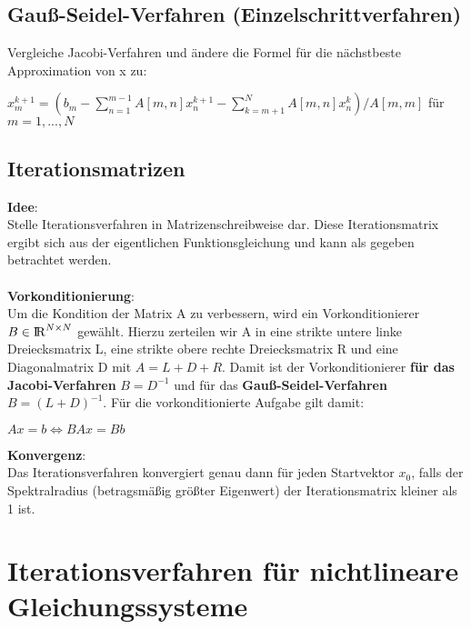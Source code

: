 \documentclass[10pt,a4paper]{article}
\def\realnumbers{{\rm I\!R}}
\begin{document}
	\subsection{Gauß-Seidel-Verfahren (Einzelschrittverfahren)}
	Vergleiche Jacobi-Verfahren und ändere die Formel für die nächstbeste Approximation von x zu:
	\begin{center}
		$x^{k+1}_m = (b_m - \sum_{n = 1}^{m - 1}A[m, n]x^{k+1}_n - \sum_{k = m + 1}^{N}A[m, n]x_n^k) / A[m, m]$ für $m = 1, ..., N$
	\end{center}
	
	\subsection{Iterationsmatrizen}
	\textbf{Idee}:\\Stelle Iterationsverfahren in Matrizenschreibweise dar. Diese Iterationsmatrix ergibt sich aus der eigentlichen Funktionsgleichung und kann als gegeben betrachtet werden.\\\\
	\textbf{Vorkonditionierung}:\\Um die Kondition der Matrix A zu verbessern, wird ein Vorkonditionierer $B \in \realnumbers^{N\times N}$ gewählt. Hierzu zerteilen wir A in eine strikte untere linke Dreiecksmatrix L, eine strikte obere rechte Dreiecksmatrix R und eine Diagonalmatrix D mit $A = L + D + R$. Damit ist der Vorkonditionierer \textbf{für das Jacobi-Verfahren} $B = D^{-1}$ und für das \textbf{Gauß-Seidel-Verfahren} $B = (L + D)^{-1}$. Für die vorkonditionierte Aufgabe gilt damit:
	\begin{center}
		$Ax = b \Leftrightarrow BAx = Bb$
	\end{center}
	\textbf{Konvergenz}:\\Das Iterationsverfahren konvergiert genau dann für jeden Startvektor $x_0$, falls der Spektralradius (betragsmäßig größter Eigenwert) der Iterationsmatrix kleiner als 1 ist.
	\newpage
	\section{Iterationsverfahren für nichtlineare Gleichungssysteme}
\end{document}
